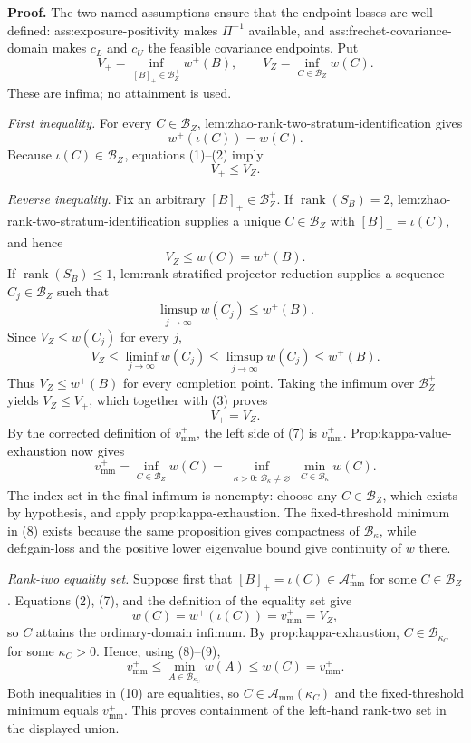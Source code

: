 \textbf{Proof.}
The two named assumptions ensure that the endpoint losses are well defined: ass:exposure-positivity makes \(\Pi^{-1}\) available, and ass:frechet-covariance-domain makes \(c_L\) and \(c_U\) the feasible covariance endpoints.  Put
\[
V_+=\inf_{[B]_+\in\mathcal B_Z^+}w^+(B),
\qquad
V_Z=\inf_{C\in\mathcal B_Z}w(C).
\tag{1}
\]
These are infima; no attainment is used.

\emph{First inequality.}
For every \(C\in\mathcal B_Z\), lem:zhao-rank-two-stratum-identification gives
\[
w^+(\iota(C))=w(C).
\tag{2}
\]
Because \(\iota(C)\in\mathcal B_Z^+\), equations (1)--(2) imply
\[
V_+\le V_Z.
\tag{3}
\]

\emph{Reverse inequality.}
Fix an arbitrary \([B]_+\in\mathcal B_Z^+\).  If \(\operatorname{rank}(S_B)=2\), lem:zhao-rank-two-stratum-identification supplies a unique \(C\in\mathcal B_Z\) with \([B]_+=\iota(C)\), and hence
\[
V_Z\le w(C)=w^+(B).
\tag{4}
\]
If \(\operatorname{rank}(S_B)\le1\), lem:rank-stratified-projector-reduction supplies a sequence \(C_j\in\mathcal B_Z\) such that
\[
\limsup_{j\to\infty}w(C_j)\le w^+(B).
\tag{5}
\]
Since \(V_Z\le w(C_j)\) for every \(j\),
\[
V_Z\le\liminf_{j\to\infty}w(C_j)
\le\limsup_{j\to\infty}w(C_j)
\le w^+(B).
\tag{6}
\]
Thus \(V_Z\le w^+(B)\) for every completion point.  Taking the infimum over \(\mathcal B_Z^+\) yields \(V_Z\le V_+\), which together with (3) proves
\[
V_+=V_Z.
\tag{7}
\]
By the corrected definition of \(v_{\mathrm{mm}}^+\), the left side of (7) is \(v_{\mathrm{mm}}^+\).  Prop:kappa-value-exhaustion now gives
\[
v_{\mathrm{mm}}^+
=\inf_{C\in\mathcal B_Z}w(C)
=\inf_{\substack{\kappa>0:\,\mathcal B_\kappa\ne\varnothing}}
\min_{C\in\mathcal B_\kappa}w(C).
\tag{8}
\]
The index set in the final infimum is nonempty: choose any \(C\in\mathcal B_Z\), which exists by hypothesis, and apply prop:kappa-exhaustion.  The fixed-threshold minimum in (8) exists because the same proposition gives compactness of \(\mathcal B_\kappa\), while def:gain-loss and the positive lower eigenvalue bound give continuity of \(w\) there.

\emph{Rank-two equality set.}
Suppose first that \([B]_+=\iota(C)\in\mathcal A_{\mathrm{mm}}^+\) for some \(C\in\mathcal B_Z\).  Equations (2), (7), and the definition of the equality set give
\[
w(C)=w^+(\iota(C))=v_{\mathrm{mm}}^+=V_Z,
\tag{9}
\]
so \(C\) attains the ordinary-domain infimum.  By prop:kappa-exhaustion, \(C\in\mathcal B_{\kappa_C}\) for some \(\kappa_C>0\).  Hence, using (8)--(9),
\[
v_{\mathrm{mm}}^+
\le\min_{A\in\mathcal B_{\kappa_C}}w(A)
\le w(C)
=v_{\mathrm{mm}}^+.
\tag{10}
\]
Both inequalities in (10) are equalities, so \(C\in\mathcal A_{\mathrm{mm}}(\kappa_C)\) and the fixed-threshold minimum equals \(v_{\mathrm{mm}}^+\).  This proves containment of the left-hand rank-two set in the displayed union.


